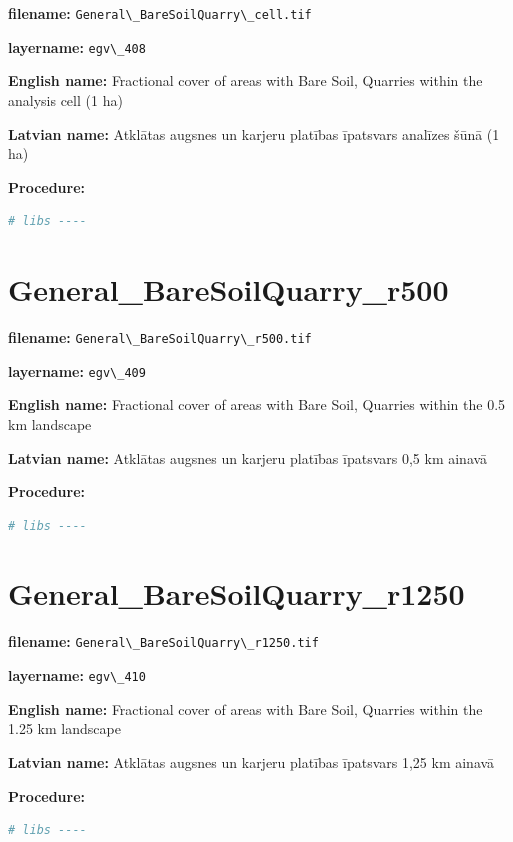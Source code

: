 \documentclass[
]{book}
\newcommand{\passthrough}[1]{#1}
\begin{document}
\textbf{filename:} \passthrough{\lstinline!General\_BareSoilQuarry\_cell.tif!}

\textbf{layername:} \passthrough{\lstinline!egv\_408!}

\textbf{English name:} Fractional cover of areas with Bare Soil, Quarries within the analysis cell (1 ha)

\textbf{Latvian name:} Atklātas augsnes un karjeru platības īpatsvars analīzes šūnā (1 ha)

\textbf{Procedure:}

\begin{lstlisting}[language=R]
# libs ----
\end{lstlisting}

\section{General\_BareSoilQuarry\_r500}\label{ch06.409}

\textbf{filename:} \passthrough{\lstinline!General\_BareSoilQuarry\_r500.tif!}

\textbf{layername:} \passthrough{\lstinline!egv\_409!}

\textbf{English name:} Fractional cover of areas with Bare Soil, Quarries within the 0.5 km landscape

\textbf{Latvian name:} Atklātas augsnes un karjeru platības īpatsvars 0,5 km ainavā

\textbf{Procedure:}

\begin{lstlisting}[language=R]
# libs ----
\end{lstlisting}

\section{General\_BareSoilQuarry\_r1250}\label{ch06.410}

\textbf{filename:} \passthrough{\lstinline!General\_BareSoilQuarry\_r1250.tif!}

\textbf{layername:} \passthrough{\lstinline!egv\_410!}

\textbf{English name:} Fractional cover of areas with Bare Soil, Quarries within the 1.25 km landscape

\textbf{Latvian name:} Atklātas augsnes un karjeru platības īpatsvars 1,25 km ainavā

\textbf{Procedure:}

\begin{lstlisting}[language=R]
# libs ----
\end{lstlisting}
\end{document}
